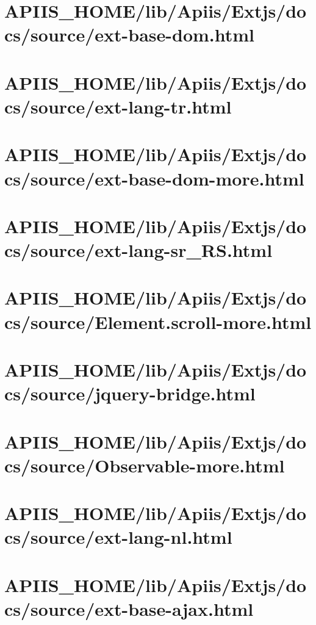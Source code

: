 \section{APIIS\_HOME/lib/Apiis/Extjs/docs/source/ext-base-dom.html} 
\section{APIIS\_HOME/lib/Apiis/Extjs/docs/source/ext-lang-tr.html} 
\section{APIIS\_HOME/lib/Apiis/Extjs/docs/source/ext-base-dom-more.html} 
\section{APIIS\_HOME/lib/Apiis/Extjs/docs/source/ext-lang-sr\_RS.html} 
\section{APIIS\_HOME/lib/Apiis/Extjs/docs/source/Element.scroll-more.html} 
\section{APIIS\_HOME/lib/Apiis/Extjs/docs/source/jquery-bridge.html} 
\section{APIIS\_HOME/lib/Apiis/Extjs/docs/source/Observable-more.html} 
\section{APIIS\_HOME/lib/Apiis/Extjs/docs/source/ext-lang-nl.html} 
\section{APIIS\_HOME/lib/Apiis/Extjs/docs/source/ext-base-ajax.html} 
